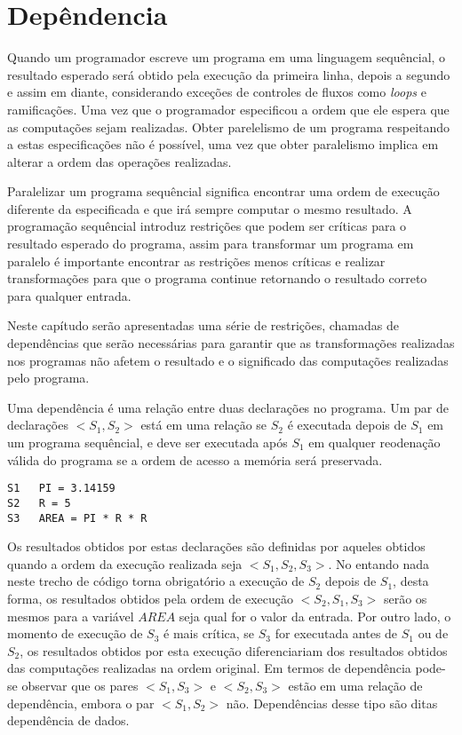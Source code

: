 
\chapter{Depêndencia}

Quando um programador escreve um programa em uma linguagem sequêncial, o
resultado esperado será obtido pela execução da primeira linha, depois a segundo
e assim em diante, considerando exceções de controles de fluxos como
\textit{loops} e ramificações. 
Uma vez que o programador especificou a ordem que ele espera que as computações 
sejam realizadas. 
Obter parelelismo de um programa respeitando a estas especificações não é
possível, uma vez que obter paralelismo implica em alterar a ordem das
operações realizadas.

Paralelizar um programa sequêncial significa encontrar uma ordem de execução
diferente da especificada e que irá sempre computar o mesmo resultado.
A programação sequêncial introduz restrições que podem ser críticas para o
resultado esperado do programa, assim para transformar um programa em paralelo é
importante encontrar as restrições menos críticas e realizar transformações para
que o programa continue retornando o resultado correto para qualquer entrada.

Neste capítudo serão apresentadas uma série de restrições, chamadas de
dependências que serão necessárias para garantir que as transformações
realizadas nos programas não afetem o resultado e o significado das computações
realizadas pelo programa.

Uma dependência é uma relação entre duas declarações no programa. 
Um par de declarações $<S_1,S_2>$ está em uma relação se $S_2$ é executada 
depois de $S_1$ em um programa sequêncial, e deve ser executada após $S_1$ 
em qualquer reodenação válida do programa se a ordem de acesso a 
memória será preservada.

\begin{verbatim}
S1   PI = 3.14159
S2   R = 5 
S3   AREA = PI * R * R
\end{verbatim}

Os resultados obtidos por estas declarações são definidas por aqueles obtidos
quando a ordem da execução realizada seja $<S_1,S_2,S_3>$. 
No entando nada neste trecho de código torna obrigatório a execução de 
$S_2$ depois de $S_1$, desta forma, os resultados obtidos pela ordem de execução 
$<S_2,S_1,S_3>$ serão os mesmos para a variável $AREA$ seja qual for o valor 
da entrada.
Por outro lado, o momento de execução de $S_3$ é mais crítica, se $S_3$ for
executada antes de $S_1$ ou de $S_2$, os resultados obtidos por esta execução
diferenciariam dos resultados obtidos das computações realizadas na ordem
original.
Em termos de dependência pode-se observar que os pares $<S_1,S_3>$ e $<S_2,S_3>$
estão em uma relação de dependência, embora o par $<S_1,S_2>$ não.
Dependências desse tipo são ditas dependência de dados.

